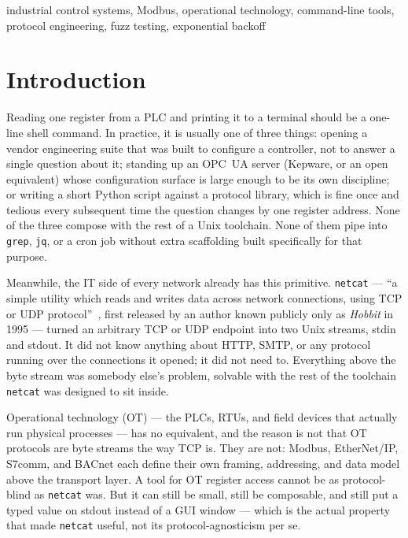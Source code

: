 \documentclass[10pt,conference]{IEEEtran}
\newcommand{\code}[1]{\texttt{#1}}
\begin{document}
\begin{IEEEkeywords}
industrial control systems, Modbus, operational technology, command-line
tools, protocol engineering, fuzz testing, exponential backoff
\end{IEEEkeywords}



\section{Introduction}

Reading one register from a PLC and printing it to a terminal should be
a one-line shell command. In practice, it is usually one of three
things: opening a vendor engineering suite that was built to configure
a controller, not to answer a single question about it; standing up an
OPC~UA server (Kepware, or an open equivalent) whose configuration
surface is large enough to be its own discipline; or writing a short
Python script against a protocol library, which is fine once and
tedious every subsequent time the question changes by one register
address. None of the three compose with the rest of a Unix toolchain.
None of them pipe into \code{grep}, \code{jq}, or a cron job without
extra scaffolding built specifically for that purpose.

Meanwhile, the IT side of every network already has this primitive.
\code{netcat} --- ``a simple utility which reads and writes data across
network connections, using TCP or UDP protocol''~\cite{nc_manpage},
first released by an author known publicly only as \emph{Hobbit} in
1995 --- turned an arbitrary TCP or UDP endpoint into two Unix streams,
stdin and stdout. It did not know anything about HTTP, SMTP, or any
protocol running over the connections it opened; it did not need to.
Everything above the byte stream was somebody else's problem, solvable
with the rest of the toolchain \code{netcat} was designed to sit inside.

Operational technology (OT) --- the PLCs, RTUs, and field devices that
actually run physical processes --- has no equivalent, and the reason is
not that OT protocols are byte streams the way TCP is. They are not:
Modbus, EtherNet/IP, S7comm, and BACnet each define their own framing,
addressing, and data model above the transport layer. A tool for OT
register access cannot be as protocol-blind as \code{netcat} was. But
it can still be small, still be composable, and still put a typed
value on stdout instead of a GUI window --- which is the actual property
that made \code{netcat} useful, not its protocol-agnosticism per se.
\end{document}
